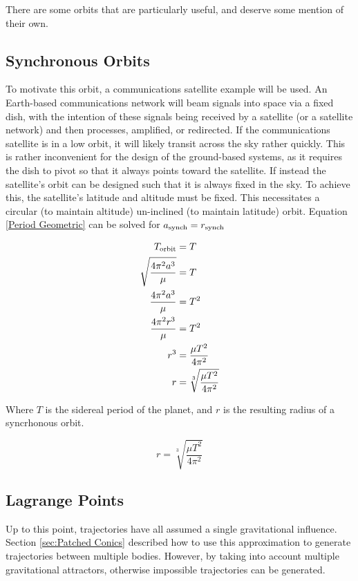 \documentclass[../basicOrbitalDynamics.tex]{subfiles}
\begin{document}
There are some orbits that are particularly useful, and deserve some mention of their own.

\bigskip\bigskip
\subsection{Synchronous Orbits}\label{Synchronous Orbits}

To motivate this orbit, a communications satellite example will be used. An Earth-based communications network will beam signals into space via a fixed dish, with the intention of these signals being received by a satellite (or a satellite network) and then processes, amplified, or redirected. If the communications satellite is in a low orbit, it will likely transit across the sky rather quickly. This is rather inconvenient for the design of the ground-based systems, as it requires the dish to pivot so that it always points toward the satellite. If instead the satellite's orbit can be designed such that it is always fixed in the sky. To achieve this, the satellite's latitude and altitude must be fixed. This necessitates a circular (to maintain altitude) un-inclined (to maintain latitude) orbit. Equation \eqref{Period Geometric} can be solved for ${a}_\text{synch}={r}_\text{synch}$

\begin{align*}
    {T}_\text{orbit}& = T  \\
    \sqrt{\frac{4\pi^2 a^3}{\mu}} & = T  \\
    \frac{4\pi^2 a^3}{\mu} & = T^2\\
    \frac{4\pi^2 r^3}{\mu} & = T^2\\
    r^3& = \frac{\mu T^2}{4\pi^2} \\
    r  & = \sqrt[3]{\frac{\mu T^2}{4\pi^2}} \\
\end{align*}

Where $T$ is the sidereal period of the planet, and $r$ is the resulting radius of a syncrhonous orbit.

\begin{equation}\label{Syncrhonous Orbit}
    r = \sqrt[3]{\frac{\mu T^2}{4\pi^2}}
\end{equation}

\bigskip\bigskip
\subsection{Lagrange Points}\label{sec:Lagrange Points}

Up to this point, trajectories have all assumed a single gravitational influence. Section \ref{sec:Patched Conics} described how to use this approximation to generate trajectories between multiple bodies. However, by taking into account multiple gravitational attractors, otherwise impossible trajectories can be generated.
\end{document}
